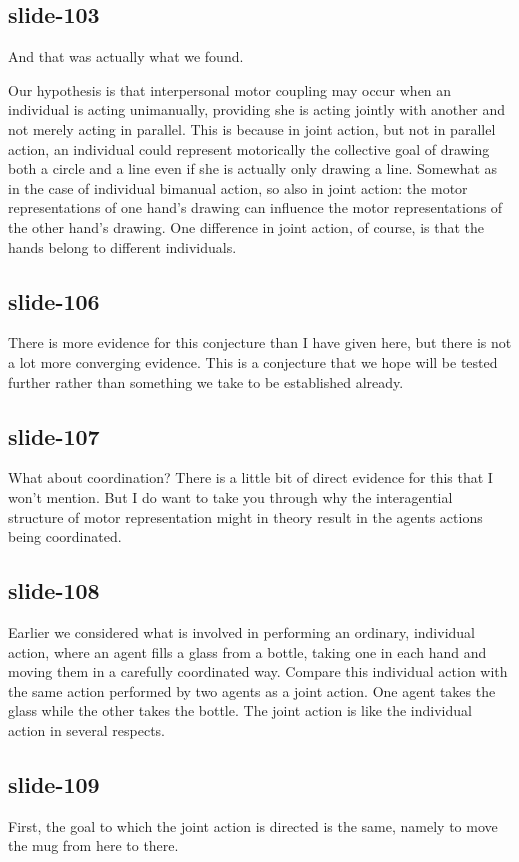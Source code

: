 \documentclass[12pt,\papersize]{extarticle}
\begin{document}
\subsection{slide-103}
And that was actually what we found.

Our hypothesis is that interpersonal motor coupling may occur when an individual is acting unimanually, providing she is acting jointly with another and not merely acting in parallel. This is because in joint action, but not in parallel action, an individual could represent motorically the collective goal of drawing both a circle and a line even if she is actually only drawing a line. Somewhat as in the case of individual bimanual action, so also in joint action: the motor representations of one hand’s drawing can influence the motor representations of the other hand’s drawing.  One difference in joint action, of course, is that the hands belong to different individuals.

\subsection{slide-106}
There is more evidence for this conjecture than I have given here,
but there is not a lot more converging evidence.
This is a conjecture that we hope will be tested further
rather than something we take to be established already.

\subsection{slide-107}
What about coordination?
There is a little bit of direct evidence for this that I won't mention.
But I do want to take you through why the interagential structure of motor representation
might in theory result in the agents actions being coordinated.

\subsection{slide-108}
Earlier we considered what is involved in performing an ordinary, individual action, where an agent
fills a glass from a bottle, taking one in each hand and moving them in a carefully coordinated way.
Compare this individual action with the same action performed by two agents as a joint action.
One agent takes the glass while the other takes the bottle.
The joint action is like the individual action in several respects.

\subsection{slide-109}
First, the goal to which the joint action is directed is the same, namely to move the mug from here to there.
\end{document}
